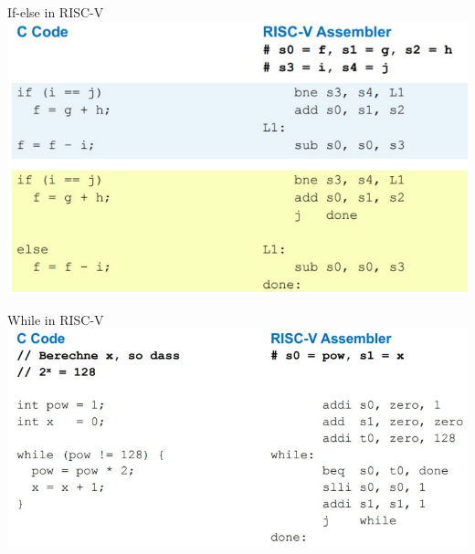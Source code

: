 \documentclass[
  german,            %
  aspectratio=169,    %
]{tumbeamer}
\begin{document}
\begin{frame}[c]{If-else in RISC-V}{}
  \centering
  \includegraphics[width=0.75\linewidth]{w03_ifelseassembly.png}
\end{frame}

\begin{frame}[c]{While in RISC-V}{}
  \centering
  \includegraphics[width=0.8\linewidth]{w03_whileassembly.png}
\end{frame}
\end{document}
